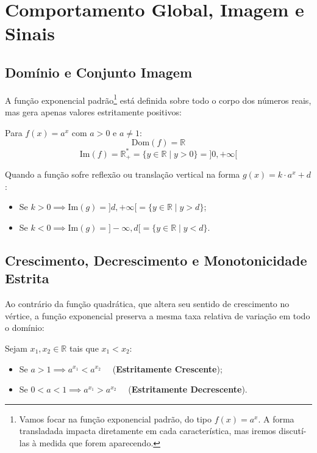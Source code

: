 \documentclass[12pt,a4paper]{report}
\begin{document}
	\chapter{Comportamento Global, Imagem e Sinais}
	\label{sec:caracteristicas_exp}
	
	\section{Domínio e Conjunto Imagem}
	\label{subsec:dominio_imagem}
	
	A função exponencial padrão\footnote{Vamos focar na função exponencial padrão, do tipo $f(x)=a^x$. A forma transladada impacta diretamente em cada característica, mas iremos discutí-las à medida que forem aparecendo.} está definida sobre todo o corpo dos números reais, mas gera apenas valores estritamente positivos:
	
	\begin{destaque}
		\label{dest:dom_im}
		Para $f(x) = a^x$ com $a > 0$ e $a \neq 1$:
		$$\text{Dom}(f) = \mathbb{R}$$
		$$\text{Im}(f) = \mathbb{R}^*_+ = \{y \in \mathbb{R} \mid y > 0\} =  {]0, +\infty[}$$
	\end{destaque}
	
	Quando a função sofre reflexão ou translação vertical na forma $g(x) = k \cdot a^x + d$:
	\begin{itemize}
		\item Se $k > 0 \implies \text{Im}(g) = {]d, +\infty[} = \{y \in \mathbb{R} \mid y > d\}$;
		\item Se $k < 0 \implies \text{Im}(g) = {]-\infty, d[} = \{y \in \mathbb{R} \mid y < d\}$.
	\end{itemize}
	
	\section{Crescimento, Decrescimento e Monotonicidade Estrita}
	\label{subsec:monotonia}
	
	Ao contrário da função quadrática, que altera seu sentido de crescimento no vértice, a função exponencial preserva a mesma taxa relativa de variação em todo o domínio:
	
	\begin{destaque}[Monotonicidade]
		\label{dest:monotonia}
		Sejam $x_1, x_2 \in \mathbb{R}$ tais que $x_1 < x_2$:
		\begin{itemize}
			\item Se $a > 1 \implies a^{x_1} < a^{x_2} \quad$ (\textbf{Estritamente Crescente});
			\item Se $0 < a < 1 \implies a^{x_1} > a^{x_2} \quad$ (\textbf{Estritamente Decrescente}).
		\end{itemize}
	\end{destaque}
	
\end{document}
